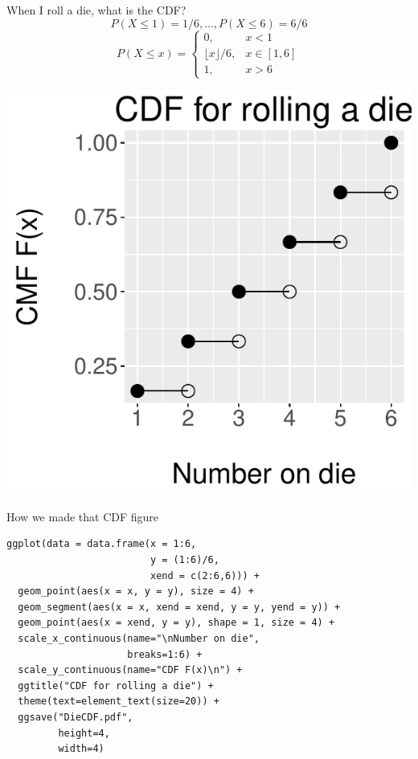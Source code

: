 \documentclass{beamer}
\begin{document}
\begin{frame}{When I roll a die, what is the CDF?}
$$P(X\leq 1)=1/6,\dots,P(X\leq 6)=6/6$$
$$P(X\leq x)=\begin{cases}
  0,& x<1 \\
  \lfloor x\rfloor/6,& x\in [1,6] \\
  1,& x>6
\end{cases}$$
\begin{center}\includegraphics[scale=.4]{figures/DieCDF.pdf}\end{center}
\end{frame}
\begin{frame}[fragile]{How we made that CDF figure}
\begin{verbatim}
ggplot(data = data.frame(x = 1:6,
                         y = (1:6)/6,
                         xend = c(2:6,6))) +
  geom_point(aes(x = x, y = y), size = 4) +
  geom_segment(aes(x = x, xend = xend, y = y, yend = y)) +
  geom_point(aes(x = xend, y = y), shape = 1, size = 4) +
  scale_x_continuous(name="\nNumber on die",
                     breaks=1:6) +
  scale_y_continuous(name="CDF F(x)\n") +
  ggtitle("CDF for rolling a die") +
  theme(text=element_text(size=20)) +
  ggsave("DieCDF.pdf",
         height=4,
         width=4)
\end{verbatim}
\end{frame}
\end{document}
